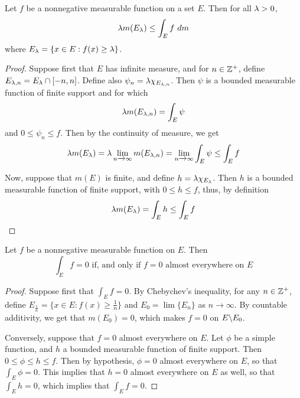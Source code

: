 \begin{theorem}\label{10.2.2}
    Let $f$ be a nonnegative measurable function on a set $E$. Then for all
    $\lambda>0$,
    \begin{equation*}
        \lambda{m(E_\lambda)} \leq \int_E{f \ dm}
    \end{equation*}
    where $E_\lambda=\{x \in E : f(x) \geq \lambda\}$.
\end{theorem}
\begin{proof}
    Suppose first that $E$ has infinite measure, and for  $n \in \mathbb{Z}^+$, define
    $E_{\lambda,n}=E_\lambda \cap [-n,n]$. Define also $\psi_n=\lambda\chi_{E_{\lambda,n}}$. Then
    $\psi$ is a bounded measurable function of finite support and for which
    \begin{equation*}
        \lambda{m(E_{\lambda,n})}=\int_E{\psi}
    \end{equation*}
    and $0 \leq \psi_n \leq f$. Then by the continuity of measure, we get
    \begin{equation*}
        \lambda{m(E_\lambda)}=
        \lambda\lim_{n \xrightarrow{} \infty}{m(E_{\lambda,n})}=
        \lim_{n \xrightarrow{} \infty}{\int_E{\psi}} \leq \int_E{f}
    \end{equation*}

    Now, suppose that $m(E)$ is finite, and define $h=\lambda\chi_{E_\lambda}$. Then $h$
    is a bounded measurable function of finite support, with  $0 \leq h \leq f$,
    thus, by definition
    \begin{equation*}
        \lambda{m(E_\lambda)}=\int_E{h} \leq \int_E{f}
    \end{equation*}
\end{proof}

\begin{lemma}\label{10.2.3}
    Let $f$ be a nonnegative measurable function on  $E$. Then
    \begin{equation*}
        \int_E{f}=0 \text{ if, and only if } f=0 \text{ almost everywhere on } E
    \end{equation*}
\end{lemma}
\begin{proof}
    Suppose first that $\int_E{f}=0$. By Chebychev's inequality, for any $n \in
    \mathbb{Z}^+$, define  $E_{\frac{1}{n}}=\{x \in E : f(x) \geq \frac{1}{n}\}$ and
    $E_0=\lim{\{E_n\}}$ as $n \xrightarrow{} \infty$. By countable additivity,
    we get that $m(E_0)=0$, which makes $f=0$ on  $E \backslash E_0$.

    Conversely, suppose that $f=0$ almost everywhere on  $E$. Let  $\phi$ be a
    simple function, and  $h$ a bounded measurable function of finite support.
    Then  $0 \leq \phi \leq h \leq f$. Then by hypothesis, $\phi=0$ almost
    everywhere on  $E$, so that $\int_E{\phi}=0$. This implies that $h=0$ almost
    everywhere on $E$ as well, so that  $\int_E{h}=0$, which implies that
    $\int_E{f}=0$.
\end{proof}

